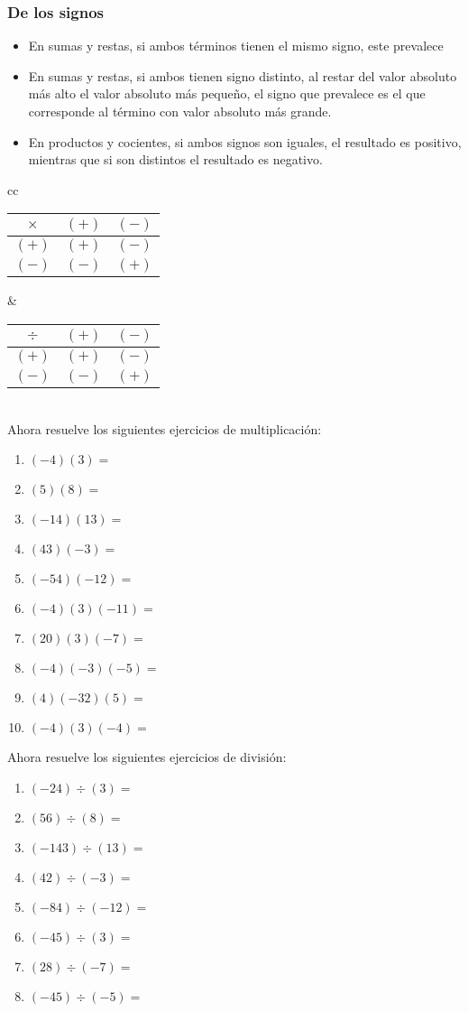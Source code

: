 \documentclass[11pt,twocolumn]{article} %
\begin{document}
\subsubsection{De los signos}
\begin{itemize}
\item En sumas y restas, si ambos términos tienen el mismo signo, este prevalece
\item En sumas y restas, si ambos tienen signo distinto, al restar del valor absoluto más alto el valor absoluto más pequeño, el signo que prevalece es el que corresponde al término con valor absoluto más grande.
\item En productos y cocientes, si ambos signos son iguales, el resultado es positivo, mientras que si son distintos el resultado es negativo.
\end{itemize}
\begin{tabular}{cc}
\begin{tabular}{|c|c|c|}
\hline
$\times$ & $(+)$ & $(-)$\\
\hline
$(+)$ & $(+)$ & $(-)$\\
\hline
$(-)$ & $(-)$ & $(+)$\\
\hline
\end{tabular} &
\begin{tabular}{|c|c|c|}
\hline
$\div$ & $(+)$ & $(-)$\\
\hline
$(+)$ & $(+)$ & $(-)$\\
\hline
$(-)$ & $(-)$ & $(+)$\\
\hline
\end{tabular}\end{tabular}\\

Ahora resuelve los siguientes ejercicios de multiplicación:
\begin{enumerate}
\item $(-4)(3)=$
\item $(5)(8)=$
\item $(-14)(13)=$
\item $(43)(-3)=$
\item $(-54)(-12)=$
\item $(-4)(3)(-11)=$
\item $(20)(3)(-7)=$
\item $(-4)(-3)(-5)=$
\item $(4)(-32)(5)=$
\item $(-4)(3)(-4)=$
\end{enumerate}

Ahora resuelve los siguientes ejercicios de división:
\begin{enumerate}
\item $(-24)\div(3)=$
\item $(56)\div(8)=$
\item $(-143)\div(13)=$
\item $(42)\div(-3)=$
\item $(-84)\div(-12)=$
\item $(-45)\div(3)=$
\item $(28)\div(-7)=$
\item $(-45)\div(-5)=$
\end{enumerate}
\end{document}

